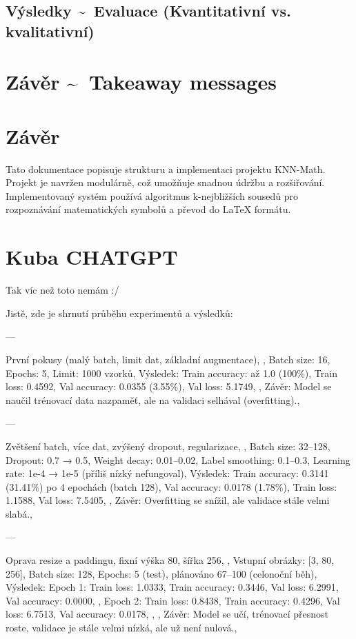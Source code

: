 \subsection{Výsledky \~~Evaluace (Kvantitativní vs. kvalitativní)}	

\section{Závěr \~~Takeaway messages}


\newpage
\section{Závěr}
Tato dokumentace popisuje strukturu a implementaci projektu KNN-Math. Projekt je navržen modulárně, což umožňuje snadnou údržbu a rozšiřování. Implementovaný systém používá algoritmus k-nejbližších sousedů pro rozpoznávání matematických symbolů a převod do LaTeX formátu.





\section{Kuba CHATGPT}
Tak víc než toto nemám :/ 

Jistě, zde je shrnutí průběhu experimentů a výsledků:

---

První pokusy (malý batch, limit dat, základní augmentace),
,
Batch size: 16,
Epochs: 5,
Limit: 1000 vzorků,
Výsledek:
Train accuracy: až 1.0 (100\%),
Train loss: 0.4592,
Val accuracy: 0.0355 (3.55\%),
Val loss: 5.1749,
,
Závěr: Model se naučil trénovací data nazpaměť, ale na validaci selhával (overfitting).,

---

Zvětšení batch, více dat, zvýšený dropout, regularizace,
,
Batch size: 32–128,
Dropout: 0.7 → 0.5,
Weight decay: 0.01–0.02,
Label smoothing: 0.1–0.3,
Learning rate: 1e-4 → 1e-5 (příliš nízký nefungoval),
Výsledek:
Train accuracy: 0.3141 (31.41\%) po 4 epochách (batch 128),
Val accuracy: 0.0178 (1.78\%),
Train loss: 1.1588,
Val loss: 7.5405,
,
Závěr: Overfitting se snížil, ale validace stále velmi slabá.,

---

Oprava resize a paddingu, fixní výška 80, šířka 256,
,
Vstupní obrázky: [3, 80, 256],
Batch size: 128,
Epochs: 5 (test), plánováno 67–100 (celonoční běh),
Výsledek:
Epoch 1:
Train loss: 1.0333,
Train accuracy: 0.3446,
Val loss: 6.2991,
Val accuracy: 0.0000,
,
Epoch 2:
Train loss: 0.8438,
Train accuracy: 0.4296,
Val loss: 6.7513,
Val accuracy: 0.0178,
,
,
Závěr: Model se učí, trénovací přesnost roste, validace je stále velmi nízká, ale už není nulová.,

